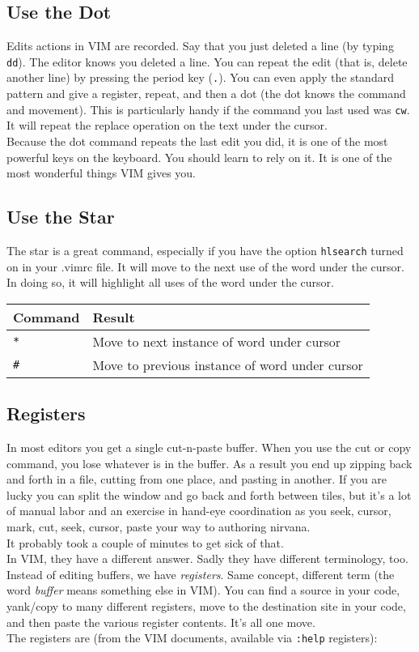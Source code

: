 \documentclass[a4paper, 12pt]{article}
\begin{document}
\subsection{Use the Dot}
\label{"Use the Dot"}
Edits actions in VIM are recorded. Say that you just deleted a line (by typing \texttt{dd}). The editor knows you deleted a line. You can repeat the edit (that is, delete another line) by pressing the period key (\texttt{.}). You can even apply the standard pattern and give a register, repeat, and then a dot (the dot knows the command and movement). This is particularly handy if the command you last used was \texttt{cw}. It will repeat the replace operation on the text under the cursor.\\
Because the dot command repeats the last edit you did, it is one of the most powerful keys on the keyboard. You should learn to rely on it. It is one of the most wonderful things VIM gives you.\\
\subsection{Use the Star}
\label{"Use the Star"}
The star is a great command, especially if you have the option \texttt{hlsearch} turned on in your .vimrc file. It will move to the next use of the word under the cursor. In doing so, it will highlight all uses of the word under the cursor.


\begin{tabular}{ l | p{8cm} }
  \textbf{Command} & \textbf{Result}\\ \hline
  \texttt{*} & Move to next instance of word under cursor\\
  \texttt{\#} & Move to previous instance of word under cursor\\ \hline
\end{tabular}

\subsection{Registers}
\label{"Registers"}
In most editors you get a single cut-n-paste buffer. When you use the cut or copy command, you lose whatever is in the buffer. As a result you end up zipping back and forth in a file, cutting from one place, and pasting in another. If you are lucky you can split the window and go back and forth between tiles, but it's a lot of manual labor and an exercise in hand-eye coordination as you seek, cursor, mark, cut, seek, cursor, paste your way to authoring nirvana.\\
It probably took a couple of minutes to get sick of that.\\
In VIM, they have a different answer. Sadly they have different terminology, too. Instead of editing buffers, we have \textit{registers}. Same concept, different term (the word \textit{buffer} means something else in VIM). You can find a source in your code, yank/copy to many different registers, move to the destination site in your code, and then paste the various register contents. It's all one move.\\
The registers are (from the VIM documents, available via \texttt{:help} registers):
\end{document}
